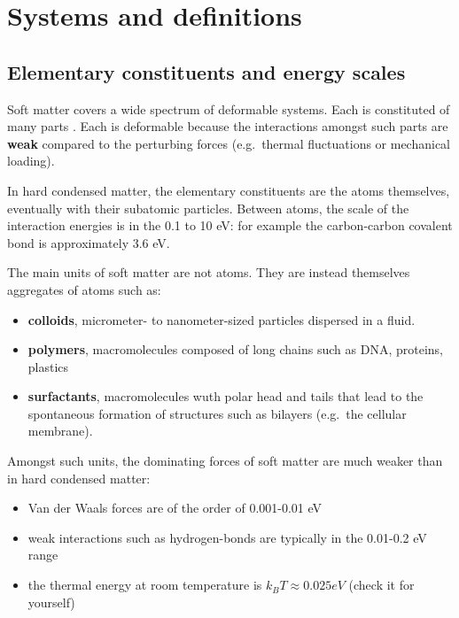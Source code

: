 \documentclass[
  letterpaper,
  enabledeprecatedfontcommands]{report}
\providecommand{\tightlist}{%
  \setlength{\itemsep}{0pt}\setlength{\parskip}{0pt}}
\begin{document}
\section{Systems and definitions}\label{systems-and-definitions}

\subsection{Elementary constituents and energy
scales}\label{elementary-constituents-and-energy-scales}

Soft matter covers a wide spectrum of deformable systems. Each is
constituted of many parts . Each is deformable because the interactions
amongst such parts are \textbf{weak} compared to the perturbing forces
(e.g.~thermal fluctuations or mechanical loading).

In hard condensed matter, the elementary constituents are the atoms
themselves, eventually with their subatomic particles. Between atoms,
the scale of the interaction energies is in the 0.1 to 10 eV: for
example the carbon-carbon covalent bond is approximately 3.6 eV.

The main units of soft matter are not atoms. They are instead themselves
aggregates of atoms such as:

\begin{itemize}
\tightlist
\item
  \textbf{colloids}, micrometer- to nanometer-sized particles dispersed
  in a fluid.
\item
  \textbf{polymers}, macromolecules composed of long chains such as DNA,
  proteins, plastics
\item
  \textbf{surfactants}, macromolecules wuth polar head and tails that
  lead to the spontaneous formation of structures such as bilayers
  (e.g.~the cellular membrane).
\end{itemize}

Amongst such units, the dominating forces of soft matter are much weaker
than in hard condensed matter:

\begin{itemize}
\tightlist
\item
  Van der Waals forces are of the order of 0.001-0.01 eV
\item
  weak interactions such as hydrogen-bonds are typically in the 0.01-0.2
  eV range
\item
  the thermal energy at room temperature is \(k_B T \approx 0.025 eV\)
  (check it for yourself)
\end{itemize}
\end{document}
